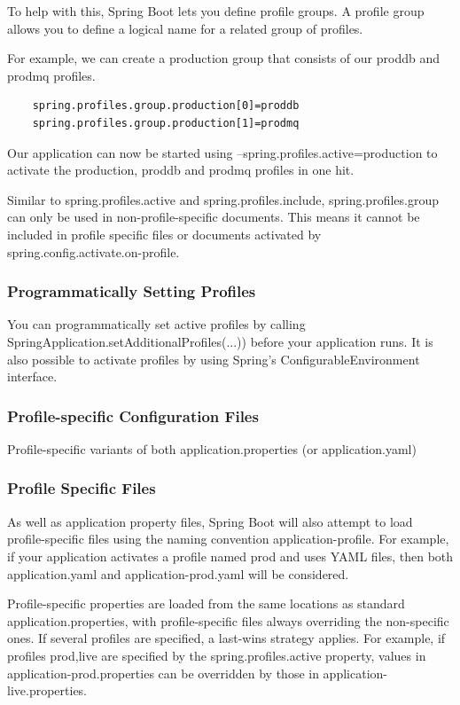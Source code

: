 \documentclass{scrartcl}
\begin{document}
To help with this, Spring Boot lets you define profile groups. A profile group allows you to define a logical name for a related group of profiles.

For example, we can create a production group that consists of our proddb and prodmq profiles.
\begin{lstlisting}
    spring.profiles.group.production[0]=proddb
    spring.profiles.group.production[1]=prodmq
\end{lstlisting}

Our application can now be started using --spring.profiles.active=production to activate the production, proddb and prodmq profiles in one hit.

Similar to spring.profiles.active and spring.profiles.include, spring.profiles.group can only be used in non-profile-specific documents. This means it cannot be included in profile specific files or documents activated by spring.config.activate.on-profile.

\subsubsection{Programmatically Setting Profiles}

You can programmatically set active profiles by calling SpringApplication.setAdditionalProfiles(...)) before your application runs. It is also possible to activate profiles by using Spring’s ConfigurableEnvironment interface.

\subsubsection{Profile-specific Configuration Files}

Profile-specific variants of both application.properties (or application.yaml)


\subsubsection{Profile Specific Files}

As well as application property files, Spring Boot will also attempt to load profile-specific files using the naming convention application-{profile}. For example, if your application activates a profile named prod and uses YAML files, then both application.yaml and application-prod.yaml will be considered.

Profile-specific properties are loaded from the same locations as standard application.properties, with profile-specific files always overriding the non-specific ones. If several profiles are specified, a last-wins strategy applies. For example, if profiles prod,live are specified by the spring.profiles.active property, values in application-prod.properties can be overridden by those in application-live.properties.
\end{document}
